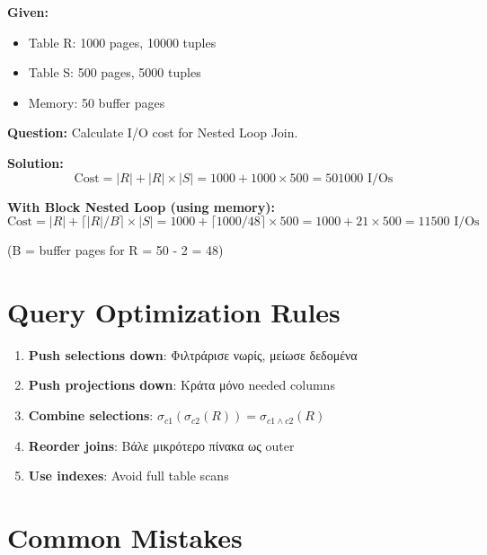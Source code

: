 \begin{examplebox}
\textbf{Given:}
\begin{itemize}
    \item Table R: 1000 pages, 10000 tuples
    \item Table S: 500 pages, 5000 tuples
    \item Memory: 50 buffer pages
\end{itemize}

\textbf{Question:} Calculate I/O cost for Nested Loop Join.

\textbf{Solution:}
\[
\text{Cost} = |R| + |R| \times |S| = 1000 + 1000 \times 500 = 501000 \text{ I/Os}
\]

\textbf{With Block Nested Loop (using memory):}
\[
\text{Cost} = |R| + \lceil |R|/B \rceil \times |S| = 1000 + \lceil 1000/48 \rceil \times 500 = 1000 + 21 \times 500 = 11500 \text{ I/Os}
\]

(B = buffer pages for R = 50 - 2 = 48)
\end{examplebox}

\section{Query Optimization Rules}

\begin{infobox}
\begin{enumerate}
    \item \textbf{Push selections down}: Φιλτράρισε νωρίς, μείωσε δεδομένα
    \item \textbf{Push projections down}: Κράτα μόνο needed columns
    \item \textbf{Combine selections}: $\sigma_{c1}(\sigma_{c2}(R)) = \sigma_{c1 \land c2}(R)$
    \item \textbf{Reorder joins}: Βάλε μικρότερο πίνακα ως outer
    \item \textbf{Use indexes}: Avoid full table scans
\end{enumerate}
\end{infobox}

\section{Common Mistakes}

